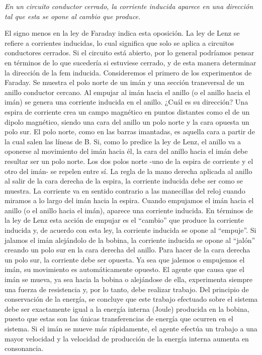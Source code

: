 \documentclass[11pt]{article}
\begin{document}
\begin{multicols}{2}
		\textit{En un circuito conductor cerrado, la corriente inducida aparece en una dirección tal que esta se opone al cambio que produce.}

		\vspace{5mm}
		
		El signo menos en la ley de Faraday indica esta oposición. 
		La ley de Lenz se refiere a corrientes inducidas, lo cual significa que solo se aplica a circuitos conductores cerrados. Si el circuito está abierto, por lo general podríamos pensar en términos de lo que sucedería si estuviese cerrado, y de esta manera determinar la dirección de la fem inducida.
		Consideremos el primero de los experimentos de Faraday. Se muestra el polo norte de un imán y una sección transversal de un anillo conductor cercano. Al empujar al imán hacia el anillo (o el anillo hacia el imán) se genera una corriente inducida en el anillo. ¿Cuál es su dirección?
		Una espira de corriente crea un campo magnético en puntos distantes como el de un dipolo magnético, siendo una cara del anillo un polo norte y la cara opuesta un polo sur. El polo norte, como en las barras imantadas, es aquella cara a partir de la cual salen las líneas de B. Si, como lo predice la ley de Lenz, el anillo va a oponerse al movimiento del imán hacia él, la cara del anillo hacia el imán debe resultar ser un polo norte. Los dos polos norte -uno de la espira de corriente y el otro del imán- se repelen entre sí. La regla de la mano derecha aplicada al anillo al salir de la cara derecha de la espira, la corriente inducida debe ser como se muestra. La corriente va en sentido contrario a las manecillas del reloj cuando miramos a lo largo del imán hacia la espira.
		Cuando empujamos el imán hacia el anillo (o el anillo hacia el imán), aparece una corriente inducida. En términos de la ley de Lenz esta acción de empujar es el “cambio” que produce la corriente inducida y, de acuerdo con esta ley, la corriente inducida se opone al “empuje”. Si jalamos el imán alejándolo de la bobina, la corriente inducida se opone al “jalón” creando un polo sur en la cara derecha del anillo. Para hacer de la cara derecha un polo sur, la corriente debe ser opuesta. Ya sea que jalemos o empujemos el imán, su movimiento es automáticamente opuesto.
		El agente que causa que el imán se mueva, ya sea hacia la bobina o alejándose de ella, experimenta siempre una fuerza de resistencia y, por lo tanto, debe realizar trabajo. Del principio de conservación de la energía, se concluye que este trabajo efectuado sobre el sistema debe ser exactamente igual a la energía interna (Joule) producida en la bobina, puesto que estas son las únicas transferencias de energía que ocurren en el sistema. Si el imán se mueve más rápidamente, el agente efectúa un trabajo a una mayor velocidad y la velocidad de producción de la energía interna aumenta en consonancia.

\end{multicols}
\end{document}
